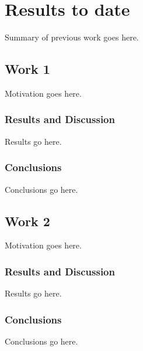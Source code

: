 \section{Results to date}
Summary of previous work goes here.
\subsection{Work 1}
Motivation goes here.
\subsubsection{Results and Discussion}
Results go here.
\subsubsection{Conclusions}
Conclusions go here.
\subsection{Work 2}
Motivation goes here.
\subsubsection{Results and Discussion}
Results go here.
\subsubsection{Conclusions}
Conclusions go here.